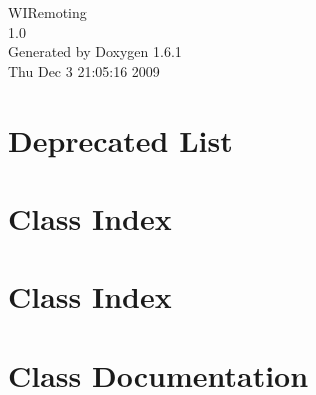 \documentclass[letterpaper]{book}
\begin{document}
\hypersetup{pageanchor=false}
\begin{titlepage}
\vspace*{7cm}
\begin{center}
{\Large WIRemoting \\[1ex]\large 1.0 }\\
\vspace*{1cm}
{\large Generated by Doxygen 1.6.1}\\
\vspace*{0.5cm}
{\small Thu Dec 3 21:05:16 2009}\\
\end{center}
\end{titlepage}
\clearemptydoublepage
{}
\tableofcontents
\clearemptydoublepage
{}
\hypersetup{pageanchor=true}
\chapter{Deprecated List}
\label{deprecated}
\hypertarget{deprecated}{}

\chapter{Class Index}

\chapter{Class Index}

\chapter{Class Documentation}
































\printindex
\end{document}
